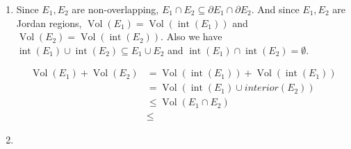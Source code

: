\documentclass[12pt]{article}
\DeclareMathOperator{\volume}{Vol}
\DeclareMathOperator{\interior}{int}
\newcommand{\boundary}{\partial}
\begin{document}
\begin{enumerate}
\begin{enumerate}
        \item Since $E_1, E_2$ are non-overlapping, $E_1 \cap E_2 \subseteq \boundary E_1 \cap \boundary E_2$.
        And since $E_1, E_2$ are Jordan regions, $\volume(E_1) = \volume(\interior(E_1))$ and $\volume(E_2) = \volume(\interior(E_2))$.
        Also we have $\interior(E_1) \cup \interior(E_2) \subseteq E_1 \cup E_2$ and $\interior(E_1) \cap \interior(E_2) = \emptyset$.

        \begin{align*}
            \volume(E_1) + \volume(E_2) &= \volume(\interior(E_1)) + \volume(\interior(E_1))\\
            &= \volume(\interior(E_1) \cup interior(E_2))\\
            &\leq \volume(E_1 \cap E_2)\\
            &\leq 
        \end{align*}

        \item 
    \end{enumerate}
\end{enumerate}
\end{document}
